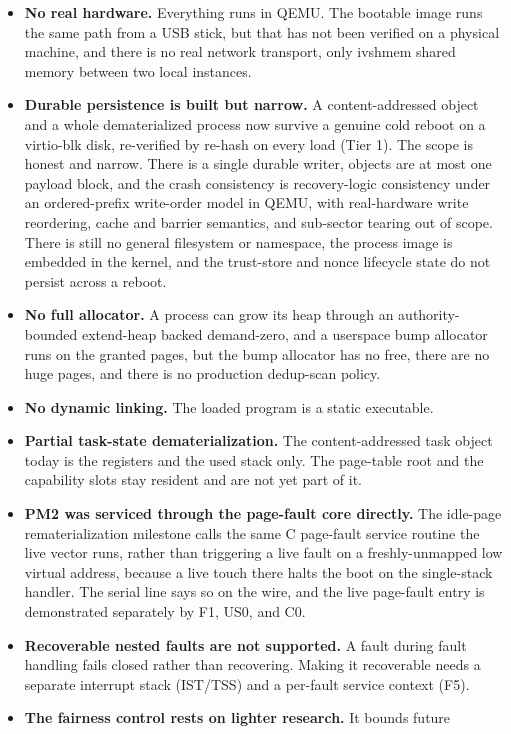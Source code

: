 \documentclass[10pt,twocolumn]{article}
\begin{document}
\begin{itemize}
\item \textbf{No real hardware.} Everything runs in QEMU. The bootable image runs
the same path from a USB stick, but that has not been verified on a physical
machine, and there is no real network transport, only ivshmem shared memory
between two local instances.
\item \textbf{Durable persistence is built but narrow.} A content-addressed object
and a whole dematerialized process now survive a genuine cold reboot on a
virtio-blk disk, re-verified by re-hash on every load (Tier 1). The scope is
honest and narrow. There is a single durable writer, objects are at most one
payload block, and the crash consistency is recovery-logic consistency under an
ordered-prefix write-order model in QEMU, with real-hardware write reordering,
cache and barrier semantics, and sub-sector tearing out of scope. There is still
no general filesystem or namespace, the process image is embedded in the kernel,
and the trust-store and nonce lifecycle state do not persist across a reboot.
\item \textbf{No full allocator.} A process can grow its heap through an
authority-bounded extend-heap backed demand-zero, and a userspace bump allocator
runs on the granted pages, but the bump allocator has no free, there are no huge
pages, and there is no production dedup-scan policy.
\item \textbf{No dynamic linking.} The loaded program is a static executable.
\item \textbf{Partial task-state dematerialization.} The content-addressed task
object today is the registers and the used stack only. The page-table root and the
capability slots stay resident and are not yet part of it.
\item \textbf{PM2 was serviced through the page-fault core directly.} The idle-page
rematerialization milestone calls the same C page-fault service routine the live
vector runs, rather than triggering a live fault on a freshly-unmapped low virtual
address, because a live touch there halts the boot on the single-stack handler.
The serial line says so on the wire, and the live page-fault entry is demonstrated
separately by F1, US0, and C0.
\item \textbf{Recoverable nested faults are not supported.} A fault during fault
handling fails closed rather than recovering. Making it recoverable needs a
separate interrupt stack (IST/TSS) and a per-fault service context (F5).
\item \textbf{The fairness control rests on lighter research.} It bounds future

\end{itemize}
\end{document}
